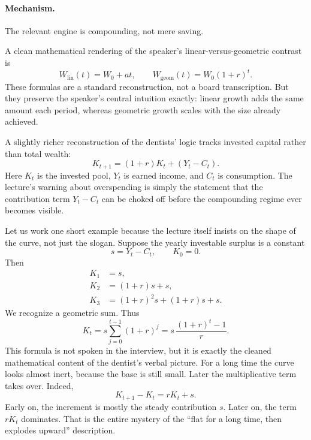 \paragraph{Mechanism.} The relevant engine is compounding, not mere saving.

A clean mathematical rendering of the speaker's linear-versus-geometric contrast is
\begin{equation}
W_{\text{lin}}(t) = W_0 + at,
\qquad
W_{\text{geom}}(t) = W_0(1+r)^t.
\end{equation}
These formulas are a standard reconstruction, not a board transcription. But they preserve the speaker's central intuition exactly: linear growth adds the same amount each period, whereas geometric growth scales with the size already achieved.

A slightly richer reconstruction of the dentists' logic tracks invested capital rather than total wealth:
\begin{equation}
K_{t+1} = (1+r)K_t + (Y_t - C_t).
\end{equation}
Here \(K_t\) is the invested pool, \(Y_t\) is earned income, and \(C_t\) is consumption. The lecture's warning about overspending is simply the statement that the contribution term \(Y_t-C_t\) can be choked off before the compounding regime ever becomes visible.

Let us work one short example because the lecture itself insists on the shape of the curve, not just the slogan. Suppose the yearly investable surplus is a constant
\begin{equation}
s = Y_t - C_t,
\qquad
K_0 = 0.
\end{equation}
Then
\begin{align}
K_1 &= s,\\
K_2 &= (1+r)s + s,\\
K_3 &= (1+r)^2 s + (1+r)s + s.
\end{align}
We recognize a geometric sum. Thus
\begin{equation}
K_t = s \sum_{j=0}^{t-1}(1+r)^j
= s\,\frac{(1+r)^t - 1}{r}.
\end{equation}
This formula is not spoken in the interview, but it is exactly the cleaned mathematical content of the dentist's verbal picture. For a long time the curve looks almost inert, because the base is still small. Later the multiplicative term takes over. Indeed,
\begin{equation}
K_{t+1} - K_t = rK_t + s.
\end{equation}
Early on, the increment is mostly the steady contribution \(s\). Later on, the term \(rK_t\) dominates. That is the entire mystery of the ``flat for a long time, then explodes upward'' description.

